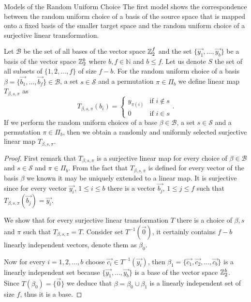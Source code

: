 \begin{section}{Models of the Random Uniform Choice}
The first model shows the correspondence between the random uniform choice of a basis of the source space that is mapped onto a fixed basis of the smaller target space and the random uniform choice of a surjective linear transformation.
\begin{remark}
\label{remark-model-surjective-linear-map-selection}
Let $\mathcal{B}$ be the set of all bases of the vector space $\mathbb{Z}_{2}^{f}$ and the set $\{\vec{y_1}, \dots, \vec{y_b}\}$ be a basis of the vector space $\mathbb{Z}_{2}^{b}$ where $b, f \in \mathbb{N}$ and $b \leq f$. Let us denote $S$ the set of all subsets of $\{1, 2, \dots, f\}$ of size $f - b$. For the random uniform choice of a basis $\beta = \{\vec{b_1}, \dots, \vec{b_f} \} \in \mathcal{B}$, a set $s \in \mathcal{S}$ and a permutation $\pi \in \Pi_b$ we define linear map $T_{\beta, s, \pi}$ as
\[
T_{\beta, s, \pi}(b_i) =  
  \begin{cases} 
    y_{\pi(i)} & \text{if } i \notin s \\
    0 & \text{if } i \in s
  \end{cases} \text{.}
\]
If we perform the random uniform choices of a base $\beta \in \mathcal{B}$, a set $s \in \mathcal{S}$ and a permutation $\pi \in \Pi_b$, then we obtain a randomly and uniformly selected surjective linear map $T_{\beta, s, \pi}$.
\end{remark}
\begin{proof}
First remark that $T_{\beta, s, \pi}$ is a surjective linear map for every choice of $\beta \in \mathcal{B}$ and $s \in \mathcal{S}$ and $\pi \in \Pi_b$. From the fact that $T_{\beta, s, \pi}$ is defined for every vector of the basis $\beta$ we known it may be uniquely extended to a linear map. It is surjective since for every vector $\vec{y_i}$, $1 \leq i \leq b$ there is a vector $\vec{b_j}$, $1 \leq j \leq f$ such that $T_{\beta, s, \pi}(\vec{b_j}) = \vec{y_i}$. 

We show that for every surjective linear transformation $T$ there is a choice of $\beta, s$ and $\pi$ such that $T_{\beta, s, \pi} = T$. Consider set $T^{-1}(\vec{0})$, it certainly contains $f - b$ linearly independent vectors, denote them as $\beta_0$. 

Now for every $i = 1, 2, \dots, b$ choose $\vec{c_i} \in T^{-1}(\vec{y_i})$, then $\beta_1 = \{\vec{c_1}, \vec{c_2}, \dots, \vec{c_b}\}$ is a linearly independent set because $\{\vec{y_1}, \dots, \vec{y_b}\}$ is a base of the vector space $\mathbb{Z}_{2}^{b}$. Since $T(\beta_0) = \{ \vec{0} \}$ we deduce that $\beta = \beta_0 \cup \beta_1$ is a linearly independent set of size $f$, thus it is a base.


\end{proof}
\end{section}
